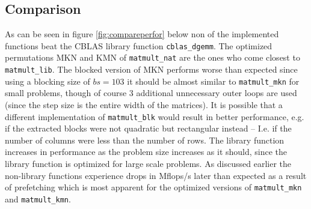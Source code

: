 \newpage
\subsection{Comparison}
As can be seen in figure \ref{fig:compareperfor} below non of the implemented functions beat the CBLAS library function \texttt{cblas\_dgemm}. The optimized permutations MKN and KMN of \texttt{matmult\_nat} are the ones who come closest to \texttt{matmult\_lib}. The blocked version of MKN performs worse than expected since using a blocking size of $bs = 103$ it should be almost similar to \texttt{matmult\_mkn} for small problems, though of course 3 additional unnecessary outer loops are used (since the step size is the entire width of the matrices). It is possible that a different implementation of \texttt{matmult\_blk} would result in better performance, e.g. if the extracted blocks were not quadratic but rectangular instead – I.e. if the number of columns were less than the number of rows. The library function increases in performance as the problem size increases as it should, since the library function is optimized for large scale problems. As discussed earlier the non-library functions experience drops in Mflops/s later than expected as a result of prefetching which is most apparent for the optimized versions of \texttt{matmult\_mkn} and \texttt{matmult\_kmn}.

